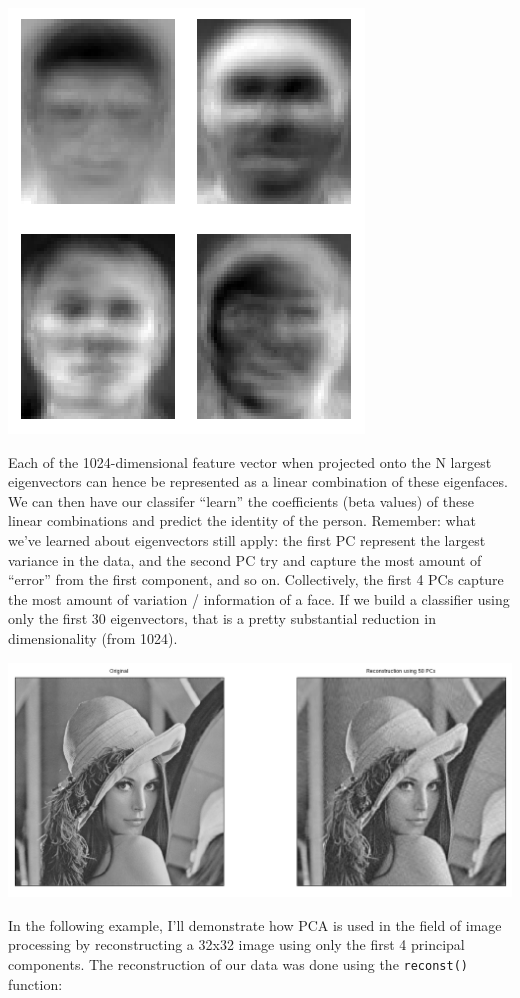 \documentclass[]{article}
\begin{document}
\includegraphics{assets/eigenfaces.png}

Each of the 1024-dimensional feature vector when projected onto the N
largest eigenvectors can hence be represented as a linear combination of
these eigenfaces. We can then have our classifer ``learn'' the
coefficients (beta values) of these linear combinations and predict the
identity of the person. Remember: what we've learned about eigenvectors
still apply: the first PC represent the largest variance in the data,
and the second PC try and capture the most amount of ``error'' from the
first component, and so on. Collectively, the first 4 PCs capture the
most amount of variation / information of a face. If we build a
classifier using only the first 30 eigenvectors, that is a pretty
substantial reduction in dimensionality (from 1024).

\includegraphics{assets/lenna.png}

In the following example, I'll demonstrate how PCA is used in the field
of image processing by reconstructing a 32x32 image using only the first
4 principal components. The reconstruction of our data was done using
the \texttt{reconst()} function:
\end{document}
